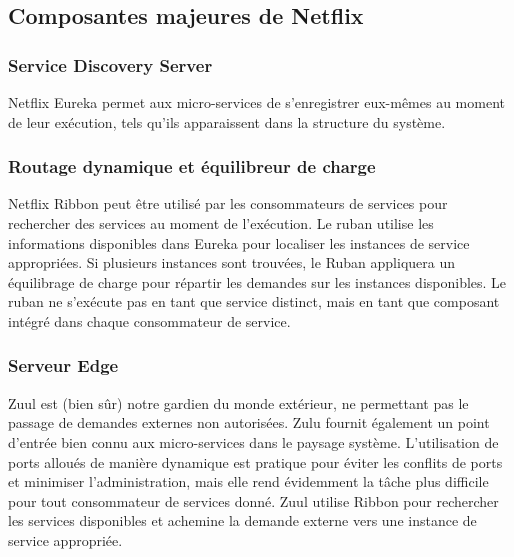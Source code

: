 \subsection{Composantes majeures de Netflix}



\subsubsection{Service Discovery Server} 

 Netflix Eureka permet aux micro-services de s’enregistrer eux-mêmes au moment de leur exécution, tels qu’ils apparaissent dans la structure du système.
\cite{MicroServices}


\subsubsection{Routage dynamique et équilibreur de charge} 

  Netflix Ribbon peut être utilisé par les consommateurs de services pour rechercher des services au moment de l’exécution. Le ruban utilise les informations disponibles dans Eureka pour localiser les instances de service appropriées. Si plusieurs instances sont trouvées, le Ruban appliquera un équilibrage de charge pour répartir les demandes sur les instances disponibles. Le ruban ne s'exécute pas en tant que service distinct, mais en tant que composant intégré dans chaque consommateur de service.\cite{MicroServices}





\subsubsection{Serveur Edge} 

  Zuul est (bien sûr) notre gardien du monde extérieur, ne permettant pas le passage de demandes externes non autorisées. Zulu fournit également un point d'entrée bien connu aux micro-services dans le paysage système. L'utilisation de ports alloués de manière dynamique est pratique pour éviter les conflits de ports et minimiser l'administration, mais elle rend évidemment la tâche plus difficile pour tout consommateur de services donné. Zuul utilise Ribbon pour rechercher les services disponibles et achemine la demande externe vers une instance de service appropriée.\cite{MicroServices}


